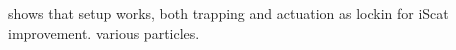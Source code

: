 \begin{quote}


\end{quote}

shows that setup works, both trapping and actuation as lockin for iScat improvement. various particles.